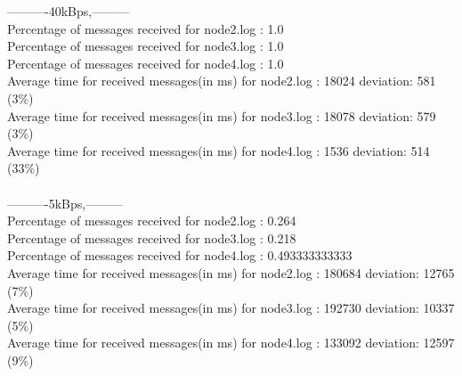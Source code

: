        ----------40kBps,---------\\
        Percentage of messages received for node2.log : 1.0\\
        Percentage of messages received for node3.log : 1.0\\
        Percentage of messages received for node4.log : 1.0\\
        Average time for received messages(in ms) for  node2.log : 18024 	deviation: 581 (3\%)\\
        Average time for received messages(in ms) for  node3.log : 18078 	deviation: 579 (3\%)\\
        Average time for received messages(in ms) for  node4.log : 1536 	deviation: 514 (33\%)\\\\
        ----------5kBps,---------\\
        Percentage of messages received for node2.log : 0.264\\
        Percentage of messages received for node3.log : 0.218\\
        Percentage of messages received for node4.log : 0.493333333333\\
        Average time for received messages(in ms) for  node2.log : 180684 	deviation: 12765 (7\%)\\
        Average time for received messages(in ms) for  node3.log : 192730 	deviation: 10337 (5\%)\\
        Average time for received messages(in ms) for  node4.log : 133092 	deviation: 12597 (9\%)